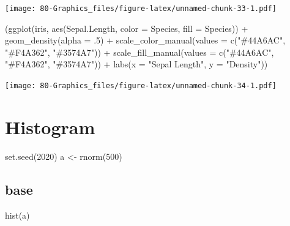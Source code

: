 \documentclass[
]{book}
\newenvironment{Shaded}{\begin{snugshade}}{\end{snugshade}}
\newcommand{\AttributeTok}[1]{\textcolor[rgb]{0.77,0.63,0.00}{#1}}
\newcommand{\DecValTok}[1]{\textcolor[rgb]{0.00,0.00,0.81}{#1}}
\newcommand{\FunctionTok}[1]{\textcolor[rgb]{0.00,0.00,0.00}{#1}}
\newcommand{\NormalTok}[1]{#1}
\newcommand{\OtherTok}[1]{\textcolor[rgb]{0.56,0.35,0.01}{#1}}
\newcommand{\SpecialCharTok}[1]{\textcolor[rgb]{0.00,0.00,0.00}{#1}}
\newcommand{\StringTok}[1]{\textcolor[rgb]{0.31,0.60,0.02}{#1}}
\begin{document}
\texttt{[image: 80-Graphics\_files/figure-latex/unnamed-chunk-33-1.pdf]}

\begin{Shaded}
\begin{Highlighting}[]
\NormalTok{(}\FunctionTok{ggplot}\NormalTok{(iris, }\FunctionTok{aes}\NormalTok{(Sepal.Length, }\AttributeTok{color =}\NormalTok{ Species, }\AttributeTok{fill =}\NormalTok{ Species)) }\SpecialCharTok{+} 
  \FunctionTok{geom\_density}\NormalTok{(}\AttributeTok{alpha =}\NormalTok{ .}\DecValTok{5}\NormalTok{) }\SpecialCharTok{+}
  \FunctionTok{scale\_color\_manual}\NormalTok{(}\AttributeTok{values =} \FunctionTok{c}\NormalTok{(}\StringTok{"\#44A6AC"}\NormalTok{, }\StringTok{"\#F4A362"}\NormalTok{, }\StringTok{"\#3574A7"}\NormalTok{)) }\SpecialCharTok{+}
  \FunctionTok{scale\_fill\_manual}\NormalTok{(}\AttributeTok{values =} \FunctionTok{c}\NormalTok{(}\StringTok{"\#44A6AC"}\NormalTok{, }\StringTok{"\#F4A362"}\NormalTok{, }\StringTok{"\#3574A7"}\NormalTok{)) }\SpecialCharTok{+}
  \FunctionTok{labs}\NormalTok{(}\AttributeTok{x =} \StringTok{"Sepal Length"}\NormalTok{, }\AttributeTok{y =} \StringTok{"Density"}\NormalTok{))}
\end{Highlighting}
\end{Shaded}

\texttt{[image: 80-Graphics\_files/figure-latex/unnamed-chunk-34-1.pdf]}

\hypertarget{histogram}{%
\section{Histogram}\label{histogram}}

\begin{Shaded}
\begin{Highlighting}[]
\FunctionTok{set.seed}\NormalTok{(}\DecValTok{2020}\NormalTok{)}
\NormalTok{a }\OtherTok{\textless{}{-}} \FunctionTok{rnorm}\NormalTok{(}\DecValTok{500}\NormalTok{)}
\end{Highlighting}
\end{Shaded}

\hypertarget{base-4}{%
\subsection{base}\label{base-4}}

\begin{Shaded}
\begin{Highlighting}[]
\FunctionTok{hist}\NormalTok{(a)}
\end{Highlighting}
\end{Shaded}
\end{document}
